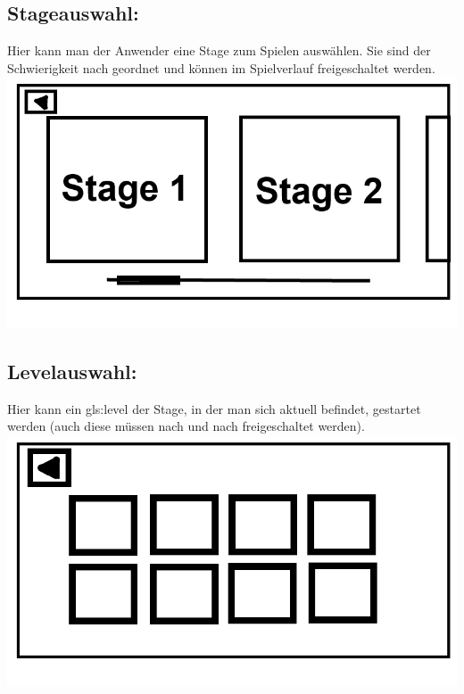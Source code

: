 \documentclass{scrartcl}
\begin{document}
\begin{enumerate}
\begin{minipage}{1\textwidth}
	\end{minipage}
	
	\begin{minipage}{1\textwidth}
		\item \subsection*{Stageauswahl:}
		Hier kann man der Anwender eine Stage zum Spielen auswählen. Sie sind der Schwierigkeit nach geordnet und können im Spielverlauf freigeschaltet werden.\\
		\includegraphics[scale=0.5]{assets/Stagemenu}
	\end{minipage}
	
	\begin{minipage}{1\textwidth}
		\item \subsection*{Levelauswahl:} \label{appaufbau:Levelauswahl}
		Hier kann ein \gls{gls:level} der Stage, in der man sich aktuell befindet, gestartet werden (auch diese müssen nach und nach freigeschaltet werden).\\
		\includegraphics[scale=0.5]{assets/Levelmenu}
	\end{minipage}
	

\end{enumerate}
\end{document}
